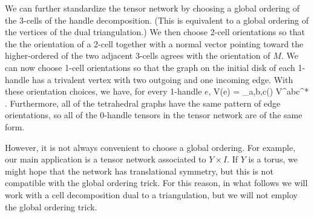 We can further standardize the tensor network by choosing a global ordering of the 3-cells of the handle decomposition.
(This is equivalent to a global ordering of the vertices of the dual triangulation.)
We then choose 2-cell orientations so that the the orientation of a 2-cell together with a normal vector pointing toward the higher-ordered of the two
adjacent 3-cells agrees with the orientation of $M$.
We can now choose 1-cell orientations so that the graph on the initial disk of each 1-handle has a trivalent vertex with two
outgoing and one incoming edge.
With these orientation choices, we have, for every 1-handle $e$,
\be
	V(e) = \bigoplus_{a,b,c\in\sob(\mcc)} V^{abc^*} .
\ee
Furthermore, all of the tetrahedral graphs have the same pattern of edge orientations, so all of the 0-handle tensors
in the tensor network are of the same form. 

However, it is not always convenient to choose a global ordering.
For example, our main application is a tensor network associated to $Y\times I$.
If $Y$ is a torus, we might hope that the network has translational symmetry, but this is not compatible with the global ordering trick.
For this reason, in what follows we will work with a cell decomposition dual to a triangulation, but we will not employ the global ordering trick.

